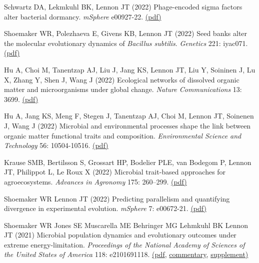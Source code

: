 \documentclass[11pt]{article}
\begin{document}
\begin{etaremune}
\item Schwartz DA, Lekmkuhl BK, Lennon JT (2022) Phage-encoded sigma factors alter bacterial dormancy. \textit{mSphere} e00927-22. \href{https://lennonlab.github.io/assets/publications/Schwartz_etal_2022.pdf}{(pdf)}

\item Shoemaker WR, Polezhaeva E, Givens KB, Lennon JT (2022) Seed banks alter the molecular evolutionary dynamics of \textit{Bacillus subtilis}. \textit{Genetics} 221: iyac071. \href{https://lennonlab.github.io/assets/publications/Shoemaker_etal_2022.pdf}{(pdf)}

\item Hu A, Choi M, Tanentzap AJ, Liu J, Jang KS, Lennon JT, Liu Y, Soininen J, Lu X, Zhang Y, Shen J, Wang J (2022) Ecological networks of dissolved organic matter and microorganisms under global change. \textit{Nature Communications} 13: 3699. \href{https://lennonlab.github.io/assets/publications/Hu_etal_2022a.pdf}{(pdf)}

\item Hu A, Jang KS, Meng F, Stegen J, Tanentzap AJ, Choi M, Lennon JT, Soinenen J, Wang J (2022) Microbial and environmental processes shape the link between organic matter functional traits and composition. \textit{Environmental Science and Technology} 56: 10504-10516. \href{https://lennonlab.github.io/assets/publications/Hu_etal_2022b.pdf}{(pdf)}

\item Krause SMB, Bertilsson S, Grossart HP, Bodelier PLE, van Bodegom P, Lennon JT, Philippot L, Le Roux X (2022) Microbial trait-based approaches for agroecosystems. \textit{Advances in Agronomy} 175: 260–299. \href{https://lennonlab.github.io/assets/publications/Krause_etal_2022.pdf}{(pdf)}

\item Shoemaker WR Lennon JT (2022) Predicting parallelism and quantifying divergence in experimental evolution. \textit{mSphere} 7: e00672-21. \href{https://lennonlab.github.io/assets/publications/Shoemaker_Lennon_2022.pdf}{(pdf)}

\item Shoemaker WR Jones SE Muscarella ME Behringer MG Lehmkuhl BK Lennon JT (2021) Microbial population dynamics and evolutionary outcomes under extreme energy-limitation. \textit{Proceedings of the National Academy of Sciences of the United States of America} 118: e2101691118. \href{https://lennonlab.github.io/assets/publications/Shoemaker_etal_2021b.pdf}{(pdf}, \href{https://lennonlab.github.io/assets/publications/Rillig_etal_2021.pdf}{commentary}, \href{https://lennonlab.github.io/assets/publications/Shoemaker_etal_2021b_Suppl.pdf}{supplement)}


\end{etaremune}
\end{document}
